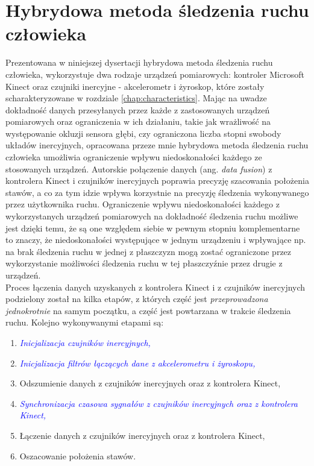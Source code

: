 \chapter{Hybrydowa metoda śledzenia ruchu człowieka}\label{chap:hybrid}

Prezentowana w niniejszej dysertacji hybrydowa metoda śledzenia ruchu człowieka, wykorzystuje dwa rodzaje urządzeń pomiarowych: kontroler Microsoft Kinect oraz czujniki inercyjne - akcelerometr i żyroskop, które zostały scharakteryzowane w rozdziale \ref{chap:characteristics}. Mając na uwadze dokładność danych przesyłanych przez każde z zastosowanych urządzeń pomiarowych oraz ograniczenia w ich działaniu, takie jak wrażliwość na występowanie okluzji sensora głębi, czy ograniczona liczba stopni swobody układów inercyjnych, opracowana przeze mnie hybrydowa metoda śledzenia ruchu człowieka umożliwia ograniczenie wpływu niedoskonałości każdego ze stosowanych urządzeń. Autorskie połączenie danych (ang. \textsl{data fusion}) z kontrolera Kinect i czujników inercyjnych poprawia precyzję szacowania położenia stawów, a co za tym idzie wpływa korzystnie na precyzję śledzenia wykonywanego przez użytkownika ruchu. Ograniczenie wpływu niedoskonałości każdego z wykorzystanych urządzeń pomiarowych na dokładność śledzenia ruchu możliwe jest dzięki temu, że są one względem siebie w pewnym stopniu komplementarne to znaczy, że niedoskonałości występujące w jednym urządzeniu i wpływające np. na brak śledzenia ruchu w jednej z płaszczyzn mogą zostać ograniczone przez wykorzystanie możliwości śledzenia ruchu w tej płaszczyźnie przez drugie z urządzeń.\\
Proces łączenia danych uzyskanych z kontrolera Kinect i z czujników inercyjnych podzielony został na kilka etapów, z których część jest \emph{przeprowadzona jednokrotnie} na samym początku, a część jest powtarzana w trakcie śledzenia ruchu. Kolejno wykonywanymi etapami są:
\begin{enumerate}
	\item \emph{\textcolor{blue}{Inicjalizacja czujników inercyjnych,}}
	\item \emph{\textcolor{blue}{Inicjalizacja filtrów łączących dane z akcelerometru i żyroskopu,}}
	\item Odszumienie danych z czujników inercyjnych oraz z kontrolera Kinect,
	\item \emph{\textcolor{blue}{Synchronizacja czasowa sygnałów z czujników inercyjnych oraz z kontrolera Kinect,}}
	\item Łączenie danych z czujników inercyjnych oraz z kontrolera Kinect,
	\item Oszacowanie położenia stawów.
\end{enumerate}

